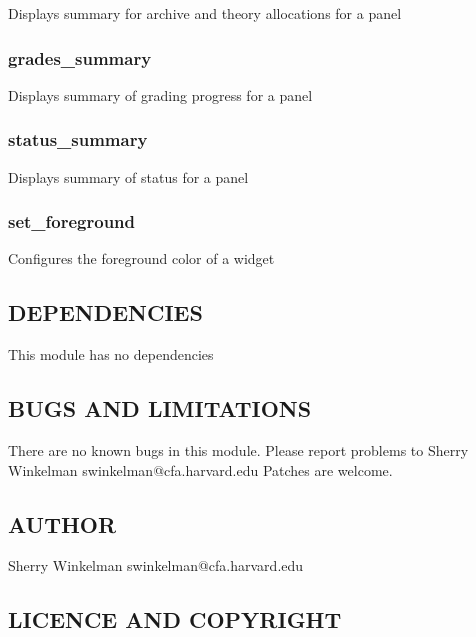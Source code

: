 \documentclass{article}
\begin{document}
Displays summary for archive and theory allocations for a panel

\subsubsection*{grades\_summary\label{Monitor_grades_summary}}


Displays summary of grading progress for a panel

\subsubsection*{status\_summary\label{Monitor_status_summary}}


Displays summary of status for a panel

\subsubsection*{set\_foreground\label{Monitor_set_foreground}}


Configures the foreground color of a widget

\subsection*{DEPENDENCIES\label{Monitor_DEPENDENCIES}}


This module has no dependencies

\subsection*{BUGS AND LIMITATIONS\label{Monitor_BUGS_AND_LIMITATIONS}}


There are no known bugs in this module.
Please report problems to Sherry Winkelman swinkelman@cfa.harvard.edu
Patches are welcome.

\subsection*{AUTHOR\label{Monitor_AUTHOR}}


Sherry Winkelman swinkelman@cfa.harvard.edu

\subsection*{LICENCE AND COPYRIGHT\label{Monitor_LICENCE_AND_COPYRIGHT}}
\end{document}
